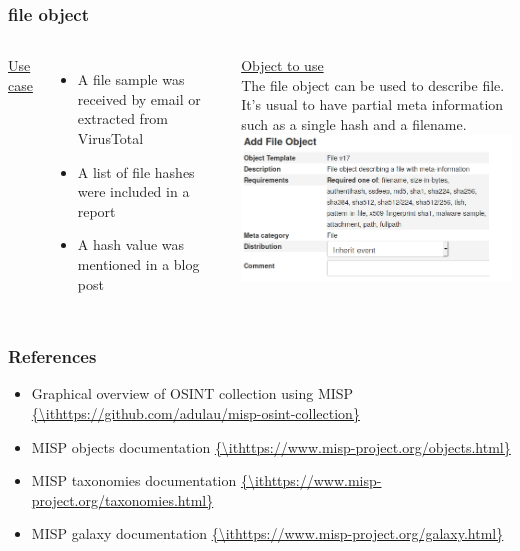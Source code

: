 \begin{frame}
\frametitle{file object}
\begin{columns}[totalwidth=\textwidth]
        \underline{Use case}\\
        \begin{itemize}
                \item A file sample was received by email or extracted from VirusTotal
                \item A list of file hashes were included in a report
                \item A hash value was mentioned in a blog post
        \end{itemize}
        \underline{Object to use}\\
        The file object can be used to describe file. It's usual to have partial meta information such as a single hash and a filename.\\
        \includegraphics[scale=0.25]{fileobject.png}
\end{columns}
\end{frame}

\begin{frame}
        \frametitle{References}
        \begin{itemize}
        \item Graphical overview of OSINT collection using MISP \url{{\ithttps://github.com/adulau/misp-osint-collection}}
        \item MISP objects documentation \url{{\ithttps://www.misp-project.org/objects.html}}
        \item MISP taxonomies documentation \url{{\ithttps://www.misp-project.org/taxonomies.html}}
        \item MISP galaxy documentation \url{{\ithttps://www.misp-project.org/galaxy.html}}
        \end{itemize}
\end{frame}

